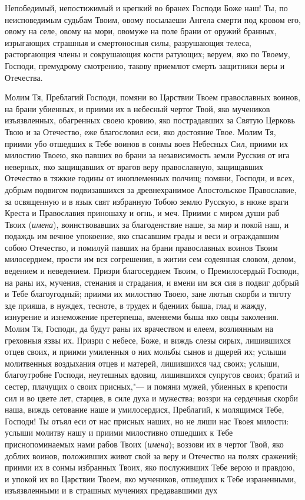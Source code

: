\begin{mymulticols}
 


Непобедимый, непостижимый и крепкий во бранех Господи Боже наш! Ты, по неисповедимым судьбам Твоим, овому посылаеши Ангела смерти под кровом его, овому на селе, овому на мори, овомуже на поле брани от оружий бранных, изрыгающих страшныя и смертоносныя силы, разрушающия телеса, расторгающия члены и сокрушающия кости ратующих; веруем, яко по Твоему, Господи, премудрому смотрению, такову приемлют смерть защитники веры и Отечества. 

Молим Тя, Преблагий Господи, помяни во Царствии Твоем православных воинов, на брани убиенных, и приими их в небесный чертог Твой, яко мучеников изъязвленных, обагренных своею кровию, яко пострадавших за Святую Церковь Твою и за Отечество, еже благословил еси, яко достояние Твое. Молим Тя, приими убо отшедших к Тебе воинов в сонмы воев Небесных Сил, приими их милостию Твоею, яко павших во брани за независимость земли Русския от ига неверных, яко защищавших от врагов веру православную, защищавших Отечество в тяжкие годины от иноплеменных полчищ; помяни, Господи, и всех, добрым подвигом подвизавшихся за древнехранимое Апостольское Православие, за освященную и в язык свят избранную Тобою землю Русскую, в нюже враги Креста и Православия приношаху и огнь, и меч. Приими с миром души раб Твоих ({\itshape имена}), воинствовавших за благоденствие наше, за мир и покой наш, и подаждь им вечное упокоение, яко спасавшим грады и веси и ограждавшим собою Отечество, и помилуй павших на брани православных воинов Твоим милосердием, прости им вся согрешения, в житии сем содеянная словом, делом, ведением и неведением. Призри благосердием Твоим, о Премилосердый Господи, на раны их, мучения, стенания и страдания, и вмени им вся сия в подвиг добрый и Тебе благоугодный; приими их милостию Твоею, зане лютыя скорби и тяготу зде прияша, в нуждех, тесноте, в трудех и бдениих быша, глад и жажду, изнурение и изнеможение претерпеша, вменяеми быша яко овцы заколения. Молим Тя, Господи, да будут раны их врачеством и елеем, возлиянным на греховныя язвы их. Призри с небесе, Боже, и виждь слезы сирых, лишившихся отцев своих, и приими умиленныя о них мольбы сынов и дщерей их; услыши молитвенныя воздыхания отцев и матерей, лишившихся чад своих; услыши, благоутробне Господи, неутешных вдовиц, лишившихся супругов своих; братий и сестер, плачущих о своих присных,"--- и помяни мужей, убиенных в крепости сил и во цвете лет, старцев, в силе духа и мужества; воззри на сердечныя скорби наша, виждь сетование наше и умилосердися, Преблагий, к молящимся Тебе, Господи! Ты отъял еси от нас присных наших, но не лиши нас Твоея милости: услыши молитву нашу и приими милостивно отшедших к Тебе приснопоминаемых нами рабов Твоих ({\itshape имена}); воззови их в чертог Твой, яко доблих воинов, положивших живот свой за веру и Отечество на полях сражений; приими их в сонмы избранных Твоих, яко послуживших Тебе верою и правдою, и упокой их во Царствии Твоем, яко мучеников, отшедших к Тебе израненными, изъязвленными и в страшных мучениях предававшими дух 
\end{mymulticols}
